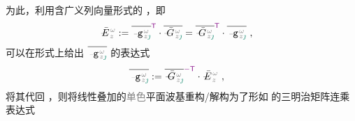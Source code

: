 为此，利用含广义列向量形式的 ，即
\begin{align} \label{eq:vec-amp_eigenmode-matrix}
	\Xint{\mathcolor{gray}{-}}{30}{\bar{E}}^{\;\!\mathcolor{gray}{\omega}}_{\;\! \mathcolor{gray}{z}} &:= \overline{\Xint{\begin{smallmatrix} ~ \\ {}^{}_{\mathcolor{gray}{-}} \\ ~ \end{smallmatrix}}{09}{\mathtt{g}}^{\;\!\mathcolor{gray}{\omega}}_{\;\! \mathcolor{gray}{z} \textcolor{PineGreen}{\jmath}}}^{\mathsf{\textcolor{Plum}{T}}} \cdot \overline{\Xint{\mathcolor{gray}{-}}{20}{\bar{G}}^{\;\!\mathcolor{gray}{\omega}}_{\;\! \mathcolor{gray}{z} \textcolor{PineGreen}{\jmath}}} = \overline{\Xint{\mathcolor{gray}{-}}{20}{\bar{G}}^{\;\!\mathcolor{gray}{\omega}}_{\;\! \mathcolor{gray}{z} \textcolor{PineGreen}{\jmath}}}^{\mathsf{\textcolor{Plum}{T}}} \cdot \overline{\Xint{\begin{smallmatrix} ~ \\ {}^{}_{\mathcolor{gray}{-}} \\ ~ \end{smallmatrix}}{09}{\mathtt{g}}^{\;\!\mathcolor{gray}{\omega}}_{\;\! \mathcolor{gray}{z} \textcolor{PineGreen}{\jmath}}} ~,
\end{align}
可以在形式上给出 $\overline{\Xint{\begin{smallmatrix} ~ \\ {}^{}_{\mathcolor{gray}{-}} \\ ~ \end{smallmatrix}}{09}{\mathtt{g}}^{\;\!\mathcolor{gray}{\omega}}_{\;\! \mathcolor{gray}{z} \textcolor{PineGreen}{\jmath}}}$ 的表达式
\begin{align} \label{eq:amp_vec}
	\overline{\Xint{\begin{smallmatrix} ~ \\ {}^{}_{\mathcolor{gray}{-}} \\ ~ \end{smallmatrix}}{09}{\mathtt{g}}^{\;\!\mathcolor{gray}{\omega}}_{\;\! \mathcolor{gray}{z} \textcolor{PineGreen}{\jmath}}} &:= \overline{\Xint{\mathcolor{gray}{-}}{20}{\bar{G}}^{\;\!\mathcolor{gray}{\omega}}_{\;\! \mathcolor{gray}{z} \textcolor{PineGreen}{\jmath}}}^{\textcolor{Plum}{-\mathsf{T}}} \cdot \Xint{\mathcolor{gray}{-}}{30}{\bar{E}}^{\;\!\mathcolor{gray}{\omega}}_{\;\! \mathcolor{gray}{z}} ~,
\end{align}
将其代回 ，则将\textcolor{PineGreen}{线性叠加的\textcolor{gray}{单色}平面波基}重构/解构为了形如  的三明治矩阵连乘表达式
